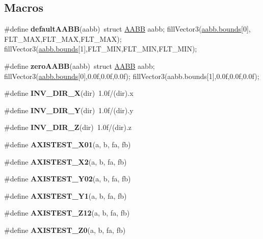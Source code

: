 \subsection*{Macros}
\begin{DoxyCompactItemize}
\item 
\#define {\bfseries default\+A\+A\+BB}(aabb)~struct \hyperlink{struct_a_a_b_b}{A\+A\+BB} aabb; fill\+Vector3(\hyperlink{_a_a_b_b_8h_aa6c25d25b398477f624c7658b78a70d4}{aabb.\+bounds}\mbox{[}0\mbox{]}, F\+L\+T\+\_\+\+M\+AX,F\+L\+T\+\_\+\+M\+AX,F\+L\+T\+\_\+\+M\+AX); fill\+Vector3(\hyperlink{_a_a_b_b_8h_aa6c25d25b398477f624c7658b78a70d4}{aabb.\+bounds}\mbox{[}1\mbox{]},F\+L\+T\+\_\+\+M\+IN,F\+L\+T\+\_\+\+M\+IN,F\+L\+T\+\_\+\+M\+IN);\hypertarget{group__g11_ga42f3a298a423fab06b0eee40013f0e90}{}\label{group__g11_ga42f3a298a423fab06b0eee40013f0e90}

\item 
\#define {\bfseries zero\+A\+A\+BB}(aabb)~struct \hyperlink{struct_a_a_b_b}{A\+A\+BB} aabb; fill\+Vector3(\hyperlink{_a_a_b_b_8h_aa6c25d25b398477f624c7658b78a70d4}{aabb.\+bounds}\mbox{[}0\mbox{]},0.\+0f,0.\+0f,0.\+0f); fill\+Vector3(aabb.\+bounds\mbox{[}1\mbox{]},0.\+0f,0.\+0f,0.\+0f);\hypertarget{group__g11_ga888ef75c65d6f129ae82671475cc058d}{}\label{group__g11_ga888ef75c65d6f129ae82671475cc058d}

\item 
\#define {\bfseries I\+N\+V\+\_\+\+D\+I\+R\+\_\+X}(dir)~1.\+0f/(dir).\+x\hypertarget{group__g11_ga4a881913bc1401d50a02aede65d3033a}{}\label{group__g11_ga4a881913bc1401d50a02aede65d3033a}

\item 
\#define {\bfseries I\+N\+V\+\_\+\+D\+I\+R\+\_\+Y}(dir)~1.\+0f/(dir).\+y\hypertarget{group__g11_ga8deb96c812cfdb3594118ea54666a9dd}{}\label{group__g11_ga8deb96c812cfdb3594118ea54666a9dd}

\item 
\#define {\bfseries I\+N\+V\+\_\+\+D\+I\+R\+\_\+Z}(dir)~1.\+0f/(dir).\+z\hypertarget{group__g11_ga22223b74e9b0687980ff54410a4b7726}{}\label{group__g11_ga22223b74e9b0687980ff54410a4b7726}

\item 
\#define {\bfseries A\+X\+I\+S\+T\+E\+S\+T\+\_\+\+X01}(a,  b,  fa,  fb)  
\item 
\#define {\bfseries A\+X\+I\+S\+T\+E\+S\+T\+\_\+\+X2}(a,  b,  fa,  fb)  
\item 
\#define {\bfseries A\+X\+I\+S\+T\+E\+S\+T\+\_\+\+Y02}(a,  b,  fa,  fb)  
\item 
\#define {\bfseries A\+X\+I\+S\+T\+E\+S\+T\+\_\+\+Y1}(a,  b,  fa,  fb)  
\item 
\#define {\bfseries A\+X\+I\+S\+T\+E\+S\+T\+\_\+\+Z12}(a,  b,  fa,  fb)  
\item 
\#define {\bfseries A\+X\+I\+S\+T\+E\+S\+T\+\_\+\+Z0}(a,  b,  fa,  fb)  
\end{DoxyCompactItemize}
